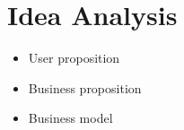 \section{Idea Analysis}

\begin{itemize}
  \item User proposition
  \item Business proposition
  \item Business model
\end{itemize}